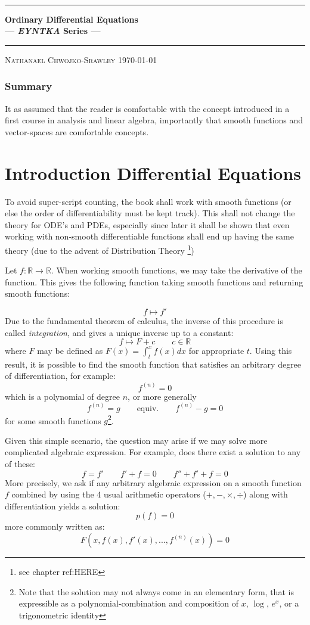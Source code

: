 \documentclass{book}
\def\title{Ordinary Differential Equations}
\def\author{Nathanael Chwojko-Srawley}
\newlength{\drop}%
\newcommand*{\plogo}{\fbox{$\mathcal{PL}$}}
\newcommand{\titleUL}{\begingroup%
\drop=0.1\textheight
\vspace*{\drop}
\begin{center}
{\LARGE {\quad}}\\[\drop]

\rule{\textwidth}{1pt}\par
\vspace{0.5\baselineskip}
{\huge\bfseries \title\\[0.2\baselineskip]
\large --- \emph{EYNTKA} Series ---}\\[0.5\baselineskip]
\rule{\textwidth}{1pt}\par
\vfill
{\Large\textsc{\author}}
\vfill
\vfill
{\large \today}
\end{center}
\endgroup}
\newcommand{\R}{{\mathbb{R}}}
\begin{document}
\titleUL
\tableofcontents

\subsection*{Summary}

It as assumed that the reader is comfortable with the concept introduced in a first course in analysis and
linear algebra, importantly that smooth functions and vector-spaces are comfortable concepts.

\chapter*{Introduction Differential Equations}

To avoid super-script counting, the book shall work with smooth functions (or else the order of
differentiability must be kept track). This shall not change the theory for ODE's and PDEs, especially since
later it shall be shown that even working with non-smooth differentiable functions shall end up having the
same theory (due to the advent of Distribution Theory \footnote{see chapter ref:HERE})

Let $f : \R \to \R$. When working smooth functions, we may take the derivative
of the function. This gives the following function taking smooth functions and returning smooth functions:

\[
	f \mapsto f'
\]
Due to the fundamental theorem of calculus, the inverse of this procedure is called \emph{integration}, and gives a unique inverse up to a constant:
\[
	f \mapsto F + c \qquad c \in \R
\]
where $F$ may be defined as $F(x) = \int_t^x f(x)dx$ for appropriate $t$. Using this result, it is possible
to find the smooth function that satisfies an arbitrary degree of differentiation, for example:
\[
	f^{(n)} = 0
\]
which is a polynomial of degree $n$, or more generally
\[
	f^{(n)} = g \qquad \text{equiv.} \qquad f^{(n)} - g = 0
\]
for some smooth functions $g$\footnote{Note that the solution may not always come in an elementary form, that
is expressible as a polynomial-combination and composition of $x$, $\log$, $e^x$, or a trigonometric
identity}.


Given this simple scenario, the question may arise if we may solve more
complicated algebraic expression. For example, does there exist a solution to any of these:
\[
	f = f'\qquad f' + f = 0\qquad f'' + f' + f = 0
\]
More precisely, we ask if any arbitrary algebraic expression on a smooth function $f$ combined by using the 4 usual arithmetic operators
($+,-,\times,\div$) along with differentiation yields a solution:
\[
	p(f) = 0
\]
more commonly written as:
\[
	F(x, f(x), f'(x), ..., f^{(n)}(x)) = 0
\]
\end{document}
